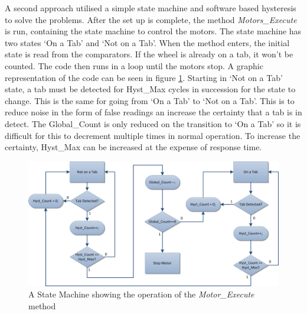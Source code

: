 A second approach utilised a simple state machine and software based hysteresis to solve the problems. After the set up is complete, the method \textit{Motors\_Execute} is run, containing the state machine to control the motors. The state machine has two states `On a Tab' and `Not on a Tab'. When the method enters, the initial state is read from the comparators. If the wheel is already on a tab, it won't be counted. The code then runs in a loop until the motors stop. A graphic representation of the code can be seen in figure \ref{fig:StateMachine}. Starting in `Not on a Tab' state, a tab must be detected for Hyst\_Max cycles in succession for the state to change. This is the same for going from `On a Tab' to `Not on a Tab'. This is to reduce noise in the form of false readings an increase the certainty that a tab is in detect. The Global\_Count is only reduced on the transition to `On a Tab' so it is difficult for this to decrement multiple times in normal operation. To increase the certainty, Hyst\_Max can be increased at the expense of response time. 


\begin{figure}
\includegraphics[width=\textwidth]{Figures/ASM.jpg}
\caption{A State Machine showing the operation of the \textit{Motor\_Execute} method}
\label{fig:StateMachine}
\end{figure}


